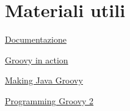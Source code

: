 \documentclass[11pt,a4paper]{book}
\begin{document}
\chapter{Materiali utili}
\href{https://groovy-lang.org/}{Documentazione}

\href{https://www.manning.com/books/groovy-in-action-second-edition}{Groovy in action}

\href{https://www.manning.com/books/making-java-groovy}{Making Java Groovy}

\href{https://pragprog.com/titles/vslg2/programming-groovy-2/}{Programming Groovy 2}
\end{document}
